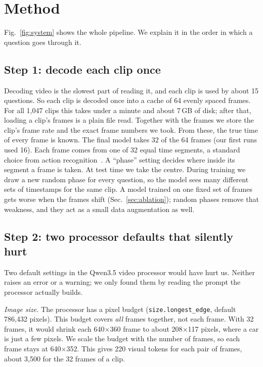 \section{Method}
\label{sec:method}

Fig.~\ref{fig:system} shows the whole pipeline. We explain it in the order
in which a question goes through it.


\subsection{Step 1: decode each clip once}
Decoding video is the slowest part of reading it, and each clip is used by
about 15 questions. So each clip is decoded once into a cache of 64 evenly
spaced frames. For all 1,047 clips this takes under a minute and about
7\,GB of disk; after that, loading a clip's frames is a plain file read. Together
with the frames we store the clip's frame rate and the exact frame numbers
we took. From these, the true time of every frame is known. The final
model takes 32 of the 64 frames (our first runs used 16). Each frame comes
from one of 32 equal time segments, a standard choice from action
recognition~\cite{wang2016tsn}. A ``phase'' setting decides where inside
its segment a frame is taken. At test time we take the centre. During
training we draw a new random phase for every question, so the model sees
many different sets of timestamps for the same clip. A model trained on one
fixed set of frames gets worse when the frames shift
(Sec.~\ref{sec:ablation}); random phases remove that weakness, and they act
as a small data augmentation as well.

\subsection{Step 2: two processor defaults that silently hurt}
Two default settings in the Qwen3.5 video processor would have hurt us.
Neither raises an error or a warning; we only found them by reading the
prompt the processor actually builds.

\emph{Image size.} The processor has a pixel budget
(\texttt{size.longest\_edge}, default 786,432 pixels). This budget covers
\emph{all} frames together, not each frame. With 32 frames, it would shrink
each 640$\times$360 frame to about 208$\times$117 pixels, where a car is
just a few pixels. We scale the budget with the number of frames, so each
frame stays at 640$\times$352. This gives 220 visual tokens for each pair
of frames, about 3,500 for the 32 frames of a clip.

